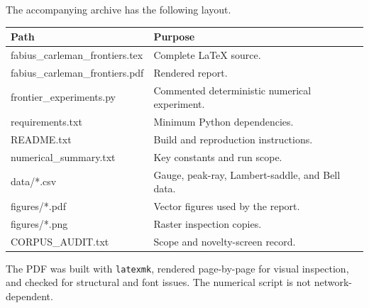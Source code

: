 \documentclass[11pt,a4paper]{article}
\theoremstyle{definition}
\theoremstyle{remark}
\begin{document}
The accompanying archive has the following layout.

\begin{center}
\begin{tabularx}{0.94\textwidth}{>{\ttfamily\raggedright\arraybackslash}p{}X}
\toprule
Path & Purpose \\
\midrule
fabius\_carleman\_frontiers.tex & Complete LaTeX source. \\
fabius\_carleman\_frontiers.pdf & Rendered report. \\
frontier\_experiments.py & Commented deterministic numerical experiment. \\
requirements.txt & Minimum Python dependencies. \\
README.txt & Build and reproduction instructions. \\
numerical\_summary.txt & Key constants and run scope. \\
data/*.csv & Gauge, peak-ray, Lambert-saddle, and Bell data. \\
figures/*.pdf & Vector figures used by the report. \\
figures/*.png & Raster inspection copies. \\
CORPUS\_AUDIT.txt & Scope and novelty-screen record. \\
\bottomrule
\end{tabularx}
\end{center}

The PDF was built with \texttt{latexmk}, rendered page-by-page for visual
inspection, and checked for structural and font issues.  The numerical script is
not network-dependent.
\end{document}
